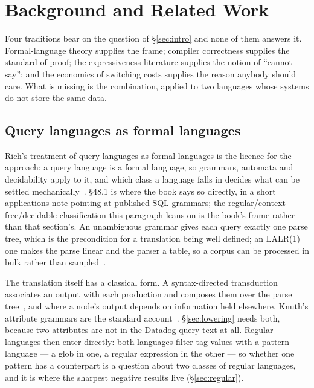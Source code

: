 
\section{Background and Related Work}
\label{sec:background}

Four traditions bear on the question of \S\ref{sec:intro} and none of them answers it.
Formal-language theory supplies the frame; compiler correctness supplies the standard of
proof; the expressiveness literature supplies the notion of ``cannot say''; and the
economics of switching costs supplies the reason anybody should care. What is missing is
the combination, applied to two languages whose systems do not store the same data.

\subsection{Query languages as formal languages}

Rich's treatment of query languages as formal languages is the licence for the
approach: a query language is a formal language, so grammars, automata and decidability
apply to it, and which class a language falls in decides what can be settled
mechanically~\citep{rich2008}. §48.1 is where the book says so directly, in a short
applications note pointing at published SQL grammars; the regular/context-free/decidable
classification this paragraph leans on is the book's frame rather than that section's. An unambiguous grammar gives
each query exactly one parse tree, which is the precondition for a translation being
well defined; an LALR(1) one makes the parse linear and the parser a table, so a corpus
can be processed in bulk rather than sampled~\citep{aho2006}.

The translation itself has a classical form. A syntax-directed transduction associates an
output with each production and composes them over the parse tree~\citep{lewis1968}, and
where a node's output depends on information held elsewhere, Knuth's attribute grammars
are the standard account~\citep{knuth1968}. \S\ref{sec:lowering} needs both, because two
attributes are not in the Datadog query text at all. Regular languages then enter
directly: both languages filter tag values with a pattern language --- a glob in one, a
regular expression in the other --- so whether one pattern has a counterpart is a
question about two classes of regular languages, and it is where the sharpest negative
results live (\S\ref{sec:regular}).

